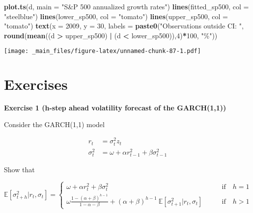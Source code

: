 \documentclass[
]{book}
\newenvironment{Shaded}{\begin{snugshade}}{\end{snugshade}}
\newcommand{\AttributeTok}[1]{\textcolor[rgb]{0.13,0.29,0.53}{#1}}
\newcommand{\DecValTok}[1]{\textcolor[rgb]{0.00,0.00,0.81}{#1}}
\newcommand{\FunctionTok}[1]{\textcolor[rgb]{0.13,0.29,0.53}{\textbf{#1}}}
\newcommand{\NormalTok}[1]{#1}
\newcommand{\SpecialCharTok}[1]{\textcolor[rgb]{0.81,0.36,0.00}{\textbf{#1}}}
\newcommand{\StringTok}[1]{\textcolor[rgb]{0.31,0.60,0.02}{#1}}
\begin{document}
\begin{Shaded}
\begin{Highlighting}[]
\FunctionTok{plot.ts}\NormalTok{(d, }\AttributeTok{main =} \StringTok{"S\&P 500 annualized growth rates"}\NormalTok{)}
\FunctionTok{lines}\NormalTok{(fitted\_sp500, }\AttributeTok{col =} \StringTok{"steelblue"}\NormalTok{)}
\FunctionTok{lines}\NormalTok{(lower\_sp500, }\AttributeTok{col =} \StringTok{"tomato"}\NormalTok{)}
\FunctionTok{lines}\NormalTok{(upper\_sp500, }\AttributeTok{col =} \StringTok{"tomato"}\NormalTok{)}
\FunctionTok{text}\NormalTok{(}\AttributeTok{x =} \DecValTok{2009}\NormalTok{, }\AttributeTok{y =} \DecValTok{30}\NormalTok{,}
     \AttributeTok{labels =} \FunctionTok{paste0}\NormalTok{(}\StringTok{"Observations outside CI: "}\NormalTok{, }
                   \FunctionTok{round}\NormalTok{(}\FunctionTok{mean}\NormalTok{((d }\SpecialCharTok{\textgreater{}}\NormalTok{ upper\_sp500) }\SpecialCharTok{|}\NormalTok{ (d }\SpecialCharTok{\textless{}}\NormalTok{ lower\_sp500)),}\DecValTok{4}\NormalTok{)}\SpecialCharTok{*}\DecValTok{100}\NormalTok{, }\StringTok{"\%"}\NormalTok{))}
\end{Highlighting}
\end{Shaded}

\texttt{[image: \_main\_files/figure-latex/unnamed-chunk-87-1.pdf]}

\hypertarget{exercises-3}{%
\section{Exercises}\label{exercises-3}}

\textbf{Exercise 1 (h-step ahead volatility forecast of the GARCH(1,1))}

Consider the GARCH(1,1) model

\[
\begin{aligned}
r_t &= \sigma^2_t z_t \\[1ex]
\sigma^2_t &= \omega + \alpha r_{t-1}^2 + \beta \sigma^2_{t-1}
\end{aligned}
\]

Show that

\[
\mathbb{E}[\sigma^2_{t+h} | r_t, \sigma_t] = 
\begin{cases}
\omega + \alpha r_{t}^2 + \beta \sigma^2_t & \qquad \text{if} \quad h=1 \\
\omega \frac{1-(\alpha+\beta)^{h-1}}{1-\alpha-\beta} + (\alpha+\beta)^{h-1} \
\mathbb{E}[\sigma^2_{t+1} | r_t, \sigma_t]  & \qquad \text{if} \quad h>1
\end{cases}
\]
\end{document}
